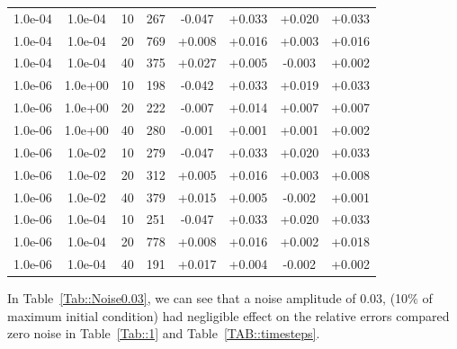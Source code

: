 \documentclass[12pt,a4paper]{article}
\begin{document}
\begin{table}
\begin{tabular}{*{8}c}
 1.0e-04 	 & 1.0e-04 	 & 10 & 267 	 & -0.047 & +0.033 & +0.020 & +0.033 \\ 
 1.0e-04 	 & 1.0e-04 	 & 20 & 769 	 & +0.008 & +0.016 & +0.003 & +0.016 \\
 1.0e-04 	 & 1.0e-04 	 & 40 & 375 	 & +0.027 & +0.005 & -0.003 & +0.002 \\ 
 
 1.0e-06 	 & 1.0e+00 	 & 10 & 198 	 & -0.042 & +0.033 & +0.019 & +0.033 \\ 
 1.0e-06 	 & 1.0e+00 	 & 20 & 222 	 & -0.007 & +0.014 & +0.007 & +0.007 \\ 
 1.0e-06 	 & 1.0e+00 	 & 40 & 280 	 & -0.001 & +0.001 & +0.001 & +0.002 \\ 
 
 1.0e-06 	 & 1.0e-02 	 & 10 & 279 	 & -0.047 & +0.033 & +0.020 & +0.033 \\ 
 1.0e-06 	 & 1.0e-02 	 & 20 & 312 	 & +0.005 & +0.016 & +0.003 & +0.008 \\ 
 1.0e-06 	 & 1.0e-02 	 & 40 & 379 	 & +0.015 & +0.005 & -0.002 & +0.001 \\
 
 1.0e-06 	 & 1.0e-04 	 & 10 & 251 	 & -0.047 & +0.033 & +0.020 & +0.033 \\ 
 1.0e-06 	 & 1.0e-04 	 & 20 & 778 	 & +0.008 & +0.016 & +0.002 & +0.018 \\ 
 1.0e-06 	 & 1.0e-04 	 & 40 & 191 	 & +0.017 & +0.004 & -0.002 & +0.002 \\ 
 

\end{tabular}
\label{TAB::double}
\end{table} 



In Table~\ref{Tab::Noise0.03}, we can see that a noise amplitude of 0.03, (10$\%$ of maximum initial condition) had negligible effect on the relative errors compared zero noise in Table~\ref{Tab::1} and Table~\ref{TAB::timesteps}. 
\end{document}
